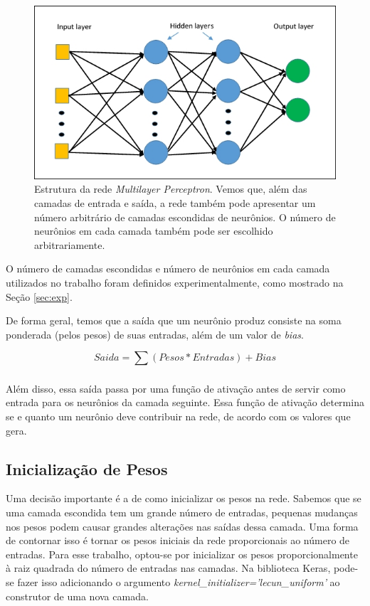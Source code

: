 \documentclass[12pt]{article}
\begin{document}
\begin{figure}[h]
  \centering
  \includegraphics[width=1\textwidth]{mlp.jpg}
  \caption{Estrutura da rede \textit{Multilayer Perceptron}. Vemos
  que, além das camadas de entrada e saída, a rede também pode
  apresentar um número arbitrário de camadas escondidas de neurônios.
  O número de neurônios em cada camada também pode ser escolhido
  arbitrariamente.}
  \label{fig:mlp}
\end{figure}

O número de camadas escondidas e número de neurônios em cada camada
utilizados no trabalho foram definidos experimentalmente, como mostrado
na Seção \ref{sec:exp}.

De forma geral, temos que a saída que um neurônio produz consiste na
soma ponderada (pelos pesos) de suas entradas, além de um valor de
\textit{bias}.

\begin{displaymath}
	Saida = \sum_{} (Pesos * Entradas) + Bias
\end{displaymath}

Além disso, essa saída passa por uma função de ativação antes de 
servir como entrada para os neurônios da camada seguinte. Essa
função de ativação determina se e quanto um neurônio deve contribuir
na rede, de acordo com os valores que gera.

\subsection{Inicialização de Pesos}

Uma decisão importante é a de como inicializar os pesos na rede. Sabemos
que se uma camada escondida tem um grande número de entradas, pequenas
mudanças nos pesos podem causar grandes alterações nas saídas dessa
camada. Uma forma de contornar isso é tornar os pesos iniciais da rede
proporcionais ao número de entradas. Para esse trabalho, optou-se por
inicializar os pesos proporcionalmente à raiz quadrada do número de
entradas nas camadas. Na biblioteca Keras, pode-se fazer isso adicionando
o argumento \textit{kernel\_initializer='lecun\_uniform'} ao construtor
de uma nova camada.
\end{document}
